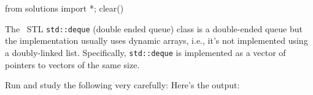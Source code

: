 \begin{python0}
from solutions import *; clear()
\end{python0}

The \cpp\ STL \verb!std::deque! (double ended queue) class is a double-ended
queue but the implementation usually uses dynamic arrays, i.e.,
it's not implemented using a doubly-linked list.
Specifically, \verb!std::deque! is implemented as a
vector of pointers to
vectors of the same size.

Run and study the following very carefully:
Here's the output:

